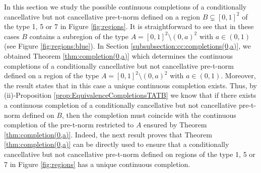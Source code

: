 In this section we study the possible continuous completions of a conditionally cancellative but not cancellative pre-t-norm defined on a region $B \subsetneq [0,1]^2$ of the type 1, 5 or 7 in Figure \ref{fig:regions}. It is straightforward to see that in these cases $B$ contains a subregion of the type $A=[0,1]^2 \setminus (0,a)^2$ with $a \in (0,1)$ (see Figure \ref{fig:regions:blue}). In Section  \ref{subsubsection:cc:completions(0,a)}, we obtained Theorem \ref{thm:completion(0,a)} which determines the continuous completions of a conditionally cancellative but not cancellative pre-t-norm defined on a region of the type $A=[0,1]^2 \setminus (0,a)^2$ with $a \in (0,1)$. Moreover, the result states that in this case a unique continuous completion exists. Thus, by (ii)-Proposition \ref{prop:EquivalenceCompletionsTATB} we know that if there exists a continuous completion of a conditionally cancellative but not cancellative pre-t-norm defined on $B$, then the completion must coincide with the continuous completion of the pre-t-norm restricted to $A$ ensured by Theorem \ref{thm:completion(0,a)}. Indeed, the next result proves that Theorem \ref{thm:completion(0,a)} can be directly used to ensure that a conditionally cancellative but not cancellative pre-t-norm defined on regions of the type 1, 5 or 7 in Figure \ref{fig:regions} has a unique continuous completion.

